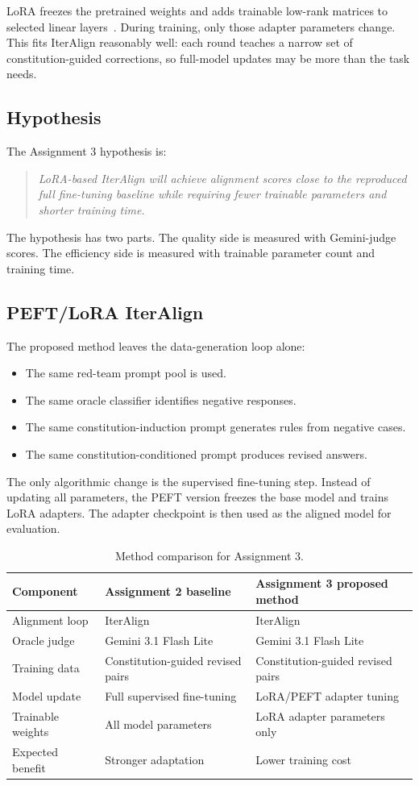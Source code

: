 \documentclass[11pt]{article}
\begin{document}
LoRA freezes the pretrained weights and adds trainable low-rank matrices to selected linear layers~\cite{hu2022lora}. During training, only those adapter parameters change. This fits IterAlign reasonably well: each round teaches a narrow set of constitution-guided corrections, so full-model updates may be more than the task needs.

\subsection{Hypothesis}
The Assignment 3 hypothesis is:
\begin{quote}
\textit{LoRA-based IterAlign will achieve alignment scores close to the reproduced full fine-tuning baseline while requiring fewer trainable parameters and shorter training time.}
\end{quote}

The hypothesis has two parts. The quality side is measured with Gemini-judge scores. The efficiency side is measured with trainable parameter count and training time.

\subsection{PEFT/LoRA IterAlign}
The proposed method leaves the data-generation loop alone:
\begin{itemize}
  \item The same red-team prompt pool is used.
  \item The same oracle classifier identifies negative responses.
  \item The same constitution-induction prompt generates rules from negative cases.
  \item The same constitution-conditioned prompt produces revised answers.
\end{itemize}

The only algorithmic change is the supervised fine-tuning step. Instead of updating all parameters, the PEFT version freezes the base model and trains LoRA adapters. The adapter checkpoint is then used as the aligned model for evaluation.

\begin{table}[H]
\centering
\caption{Method comparison for Assignment 3.}
\label{tab:method-comparison}
\begin{tabular}{lll}
\toprule
Component & Assignment 2 baseline & Assignment 3 proposed method \\
\midrule
Alignment loop & IterAlign & IterAlign \\
Oracle judge & Gemini 3.1 Flash Lite & Gemini 3.1 Flash Lite \\
Training data & Constitution-guided revised pairs & Constitution-guided revised pairs \\
Model update & Full supervised fine-tuning & LoRA/PEFT adapter tuning \\
Trainable weights & All model parameters & LoRA adapter parameters only \\
Expected benefit & Stronger adaptation & Lower training cost \\
\bottomrule
\end{tabular}
\end{table}
\end{document}
